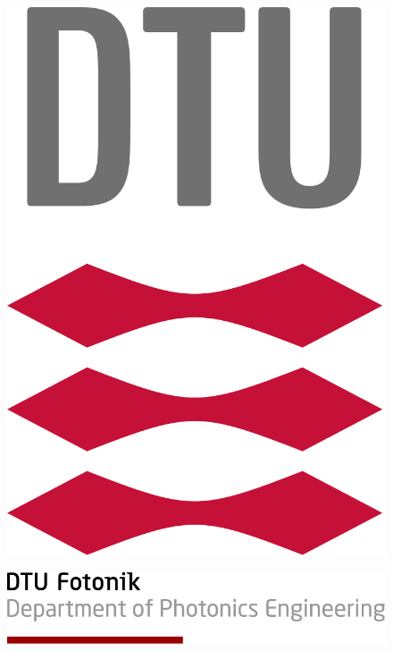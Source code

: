 \documentclass{memoir}
\title{
\noindent\makebox[\linewidth]{\rule{\textwidth}{1pt}} 
\textmd{\huge \textbf{\hmwkClass \hmwkTitle}}\\
\large\vspace{0.1in}\hmwkDueDate\\
\vspace{0.1in}\large{\textit{\hmwkClassInstructor\ \hmwkClassTime}}
\noindent\makebox[\linewidth]{\rule{\textwidth}{1pt}} 
\vspace{1in}
}
\author{\large\textbf{\hmwkAuthorName}}
\date{} %
\begin{document}
\begin{figure}
	\centering
	\includegraphics[scale=0.15]{dtulogo.png}
\end{figure}

\begin{figure}[!b]
	\includegraphics[scale=0.25]{dtufooter.png}
\end{figure}
\maketitle
\thispagestyle{empty}
\end{document}
